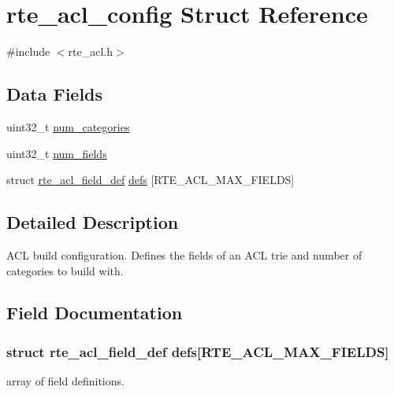 \hypertarget{structrte__acl__config}{}\section{rte\+\_\+acl\+\_\+config Struct Reference}
\label{structrte__acl__config}


{\ttfamily \#include $<$rte\+\_\+acl.\+h$>$}

\subsection*{Data Fields}
\begin{DoxyCompactItemize}
\item 
uint32\+\_\+t \hyperlink{structrte__acl__config_aed3261c5c26c050f5808d181c9c4b974}{num\+\_\+categories}
\item 
uint32\+\_\+t \hyperlink{structrte__acl__config_a9674ba2b63ce1c10be3dc3aacb0ea063}{num\+\_\+fields}
\item 
struct \hyperlink{structrte__acl__field__def}{rte\+\_\+acl\+\_\+field\+\_\+def} \hyperlink{structrte__acl__config_aef4faaa8857947cebd1a699b93c444f1}{defs} \mbox{[}R\+T\+E\+\_\+\+A\+C\+L\+\_\+\+M\+A\+X\+\_\+\+F\+I\+E\+L\+D\+S\mbox{]}
\end{DoxyCompactItemize}


\subsection{Detailed Description}
A\+C\+L build configuration. Defines the fields of an A\+C\+L trie and number of categories to build with. 

\subsection{Field Documentation}
\hypertarget{structrte__acl__config_aef4faaa8857947cebd1a699b93c444f1}{}
\subsubsection[{defs}]{\setlength{\rightskip}{0pt plus 5cm}struct {\bf rte\+\_\+acl\+\_\+field\+\_\+def} defs\mbox{[}R\+T\+E\+\_\+\+A\+C\+L\+\_\+\+M\+A\+X\+\_\+\+F\+I\+E\+L\+D\+S\mbox{]}}\label{structrte__acl__config_aef4faaa8857947cebd1a699b93c444f1}
array of field definitions. \hypertarget{structrte__acl__config_aed3261c5c26c050f5808d181c9c4b974}{}
